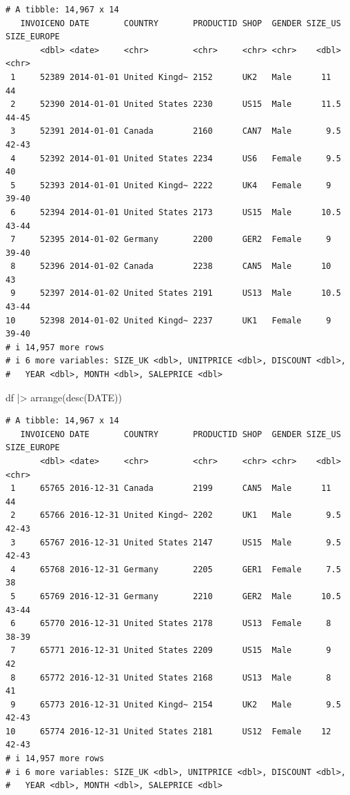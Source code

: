 \documentclass[
  letterpaper,
  DIV=11,
  numbers=noendperiod]{scrreprt}
\newenvironment{Shaded}{\begin{snugshade}}{\end{snugshade}}
\newcommand{\FunctionTok}[1]{\textcolor[rgb]{0.28,0.35,0.67}{#1}}
\newcommand{\NormalTok}[1]{\textcolor[rgb]{0.00,0.23,0.31}{#1}}
\newcommand{\SpecialCharTok}[1]{\textcolor[rgb]{0.37,0.37,0.37}{#1}}
\begin{document}
\begin{verbatim}
# A tibble: 14,967 x 14
   INVOICENO DATE       COUNTRY       PRODUCTID SHOP  GENDER SIZE_US SIZE_EUROPE
       <dbl> <date>     <chr>         <chr>     <chr> <chr>    <dbl> <chr>      
 1     52389 2014-01-01 United Kingd~ 2152      UK2   Male      11   44         
 2     52390 2014-01-01 United States 2230      US15  Male      11.5 44-45      
 3     52391 2014-01-01 Canada        2160      CAN7  Male       9.5 42-43      
 4     52392 2014-01-01 United States 2234      US6   Female     9.5 40         
 5     52393 2014-01-01 United Kingd~ 2222      UK4   Female     9   39-40      
 6     52394 2014-01-01 United States 2173      US15  Male      10.5 43-44      
 7     52395 2014-01-02 Germany       2200      GER2  Female     9   39-40      
 8     52396 2014-01-02 Canada        2238      CAN5  Male      10   43         
 9     52397 2014-01-02 United States 2191      US13  Male      10.5 43-44      
10     52398 2014-01-02 United Kingd~ 2237      UK1   Female     9   39-40      
# i 14,957 more rows
# i 6 more variables: SIZE_UK <dbl>, UNITPRICE <dbl>, DISCOUNT <dbl>,
#   YEAR <dbl>, MONTH <dbl>, SALEPRICE <dbl>
\end{verbatim}

\begin{Shaded}
\begin{Highlighting}[]
\NormalTok{df }\SpecialCharTok{|\textgreater{}}
    \FunctionTok{arrange}\NormalTok{(}\FunctionTok{desc}\NormalTok{(DATE))     }
\end{Highlighting}
\end{Shaded}

\begin{verbatim}
# A tibble: 14,967 x 14
   INVOICENO DATE       COUNTRY       PRODUCTID SHOP  GENDER SIZE_US SIZE_EUROPE
       <dbl> <date>     <chr>         <chr>     <chr> <chr>    <dbl> <chr>      
 1     65765 2016-12-31 Canada        2199      CAN5  Male      11   44         
 2     65766 2016-12-31 United Kingd~ 2202      UK1   Male       9.5 42-43      
 3     65767 2016-12-31 United States 2147      US15  Male       9.5 42-43      
 4     65768 2016-12-31 Germany       2205      GER1  Female     7.5 38         
 5     65769 2016-12-31 Germany       2210      GER2  Male      10.5 43-44      
 6     65770 2016-12-31 United States 2178      US13  Female     8   38-39      
 7     65771 2016-12-31 United States 2209      US15  Male       9   42         
 8     65772 2016-12-31 United States 2168      US13  Male       8   41         
 9     65773 2016-12-31 United Kingd~ 2154      UK2   Male       9.5 42-43      
10     65774 2016-12-31 United States 2181      US12  Female    12   42-43      
# i 14,957 more rows
# i 6 more variables: SIZE_UK <dbl>, UNITPRICE <dbl>, DISCOUNT <dbl>,
#   YEAR <dbl>, MONTH <dbl>, SALEPRICE <dbl>
\end{verbatim}
\end{document}
